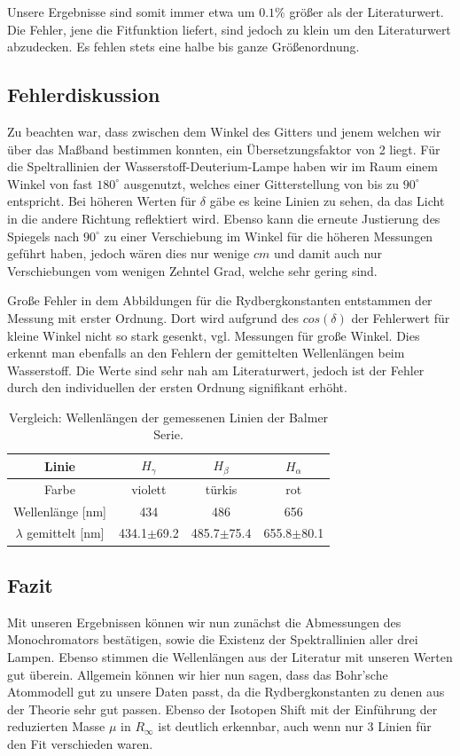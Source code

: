 \documentclass[]{article}
\begin{document}
Unsere Ergebnisse sind somit immer etwa um $0.1\%$ größer als der Literaturwert. Die Fehler, jene die Fitfunktion liefert, sind jedoch zu klein um den Literaturwert abzudecken. Es fehlen stets eine halbe bis ganze Größenordnung.

\subsection{Fehlerdiskussion}
Zu beachten war, dass zwischen dem Winkel des Gitters und jenem welchen wir über das Maßband bestimmen konnten, ein Übersetzungsfaktor von 2 liegt. Für die Speltrallinien der Wasserstoff-Deuterium-Lampe haben wir im Raum einem Winkel von fast $180^\circ$ ausgenutzt, welches einer Gitterstellung von bis zu $90^\circ$ entspricht. Bei höheren Werten für $\delta$ gäbe es keine Linien zu sehen, da das Licht in die andere Richtung reflektiert wird. Ebenso kann die erneute Justierung des Spiegels nach $90^\circ$ zu einer Verschiebung im Winkel für die höheren Messungen geführt haben, jedoch wären dies nur wenige $cm$ und damit auch nur Verschiebungen vom wenigen Zehntel Grad, welche sehr gering sind.

Große Fehler in dem Abbildungen für die Rydbergkonstanten entstammen der Messung mit erster Ordnung. Dort wird aufgrund des $cos(\delta)$ der Fehlerwert für kleine Winkel nicht so stark gesenkt, vgl. Messungen für große Winkel. Dies erkennt man ebenfalls an den Fehlern der gemittelten Wellenlängen beim Wasserstoff. Die Werte sind sehr nah am Literaturwert, jedoch ist der Fehler durch den individuellen der ersten Ordnung signifikant erhöht.

\begin{table}[H]
	\centering
	\begin{tabular}{c|c|c|c}
		Linie & $H_\gamma$ & $H_\beta$ & $H_\alpha$ \\
		\hline
		Farbe & violett & türkis & rot \\
		\hline
		Wellenlänge [nm]  & 434 & 486 & 656 \\
		\hline
		\hline
		$\lambda$ gemittelt [nm] & 434.1$\pm$69.2 & 485.7$\pm$75.4 & 655.8$\pm$80.1 \\		
	\end{tabular}
	\caption{Vergleich: Wellenlängen der gemessenen Linien der Balmer Serie.}
\end{table}

\subsection{Fazit}
Mit unseren Ergebnissen können wir nun zunächst die Abmessungen des Monochromators bestätigen, sowie die Existenz der Spektrallinien aller drei Lampen. Ebenso stimmen die Wellenlängen aus der Literatur mit unseren Werten gut überein. 
Allgemein können wir hier nun sagen, dass das Bohr'sche Atommodell gut zu unsere Daten passt, da die Rydbergkonstanten zu denen aus der Theorie sehr gut passen. Ebenso der Isotopen Shift mit der Einführung der reduzierten Masse $\mu$ in $R_\infty$ ist deutlich erkennbar, auch wenn nur 3 Linien für den Fit verschieden waren.
\end{document}
